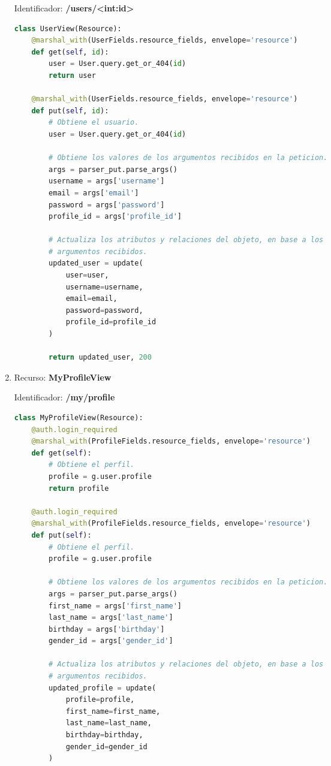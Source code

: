 \begin{enumerate}
Identificador: \textbf{/users/<int:id>}

\begin{lstlisting}[language=Python]
class UserView(Resource):
    @marshal_with(UserFields.resource_fields, envelope='resource')
    def get(self, id):
        user = User.query.get_or_404(id)
        return user

    @marshal_with(UserFields.resource_fields, envelope='resource')
    def put(self, id):
        # Obtiene el usuario.
        user = User.query.get_or_404(id)

        # Obtiene los valores de los argumentos recibidos en la peticion.
        args = parser_put.parse_args()
        username = args['username']
        email = args['email']
        password = args['password']
        profile_id = args['profile_id']

        # Actualiza los atributos y relaciones del objeto, en base a los
        # argumentos recibidos.
        updated_user = update(
            user=user,
            username=username,
            email=email,
            password=password,
            profile_id=profile_id
        )

        return updated_user, 200
\end{lstlisting}

\item Recurso: \textbf{MyProfileView}

Identificador: \textbf{/my/profile}

\begin{lstlisting}[language=Python]
class MyProfileView(Resource):
    @auth.login_required
    @marshal_with(ProfileFields.resource_fields, envelope='resource')
    def get(self):
        # Obtiene el perfil.
        profile = g.user.profile
        return profile

    @auth.login_required
    @marshal_with(ProfileFields.resource_fields, envelope='resource')
    def put(self):
        # Obtiene el perfil.
        profile = g.user.profile

        # Obtiene los valores de los argumentos recibidos en la peticion.
        args = parser_put.parse_args()
        first_name = args['first_name']
        last_name = args['last_name']
        birthday = args['birthday']
        gender_id = args['gender_id']

        # Actualiza los atributos y relaciones del objeto, en base a los
        # argumentos recibidos.
        updated_profile = update(
            profile=profile,
            first_name=first_name,
            last_name=last_name,
            birthday=birthday,
            gender_id=gender_id
        )


\end{lstlisting}
\end{enumerate}
